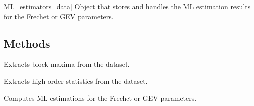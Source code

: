 \documentclass[a4paper,11pt,openany,english]{sphinxmanual}
\begin{document}
\begin{fulllineitems}
\begin{description}
\sphinxlineitem{ML\_estimators}{[}ML\_estimators\_data{]}
\sphinxAtStartPar
Object that stores and handles the ML estimation results for the Frechet or GEV parameters.

\end{description}


\subsection{Methods}
\label{\detokenize{api_topt:id15}}\begin{description}
\sphinxAtStartPar
Extracts block maxima from the dataset.

\sphinxAtStartPar
Extracts high order statistics from the dataset.

\sphinxAtStartPar
Computes ML estimations for the Frechet or GEV parameters.

\end{description}



\end{fulllineitems}
\end{document}
